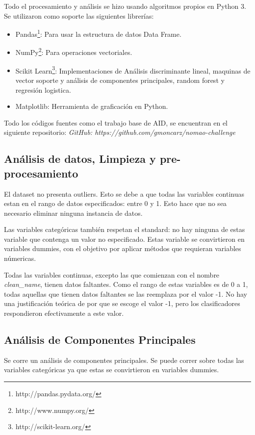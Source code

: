 \documentclass[journal]{IEEEtran}
\begin{document}
Todo el procesamiento y análisis se hizo usando algoritmos propios en Python 3. Se
utilizaron como soporte las siguientes librerías:
\begin{itemize}
\item Pandas\footnote{http://pandas.pydata.org/}: Para usar la estructura de datos Data Frame.
\item NumPy\footnote{http://www.numpy.org/}: Para operaciones vectoriales.
\item Scikit Learn\footnote{http://scikit-learn.org/}: Implementaciones de Análisis 
	discriminante lineal, maquinas de vector soporte y análisis
	de componentes principales, random forest y regresión logistica.
\item Matplotlib: Herramienta de graficación en Python.
\end{itemize}

Todo los códigos fuentes como el trabajo base de AID,
se encuentran en el siguiente repositorio: 
\textit{GitHub: https://github.com/gmoncarz/nomao-challenge}

\subsection{Análisis de datos, Limpieza y pre-procesamiento}
El dataset no presenta outliers. Esto se debe a que todas las variables continuas estan
en el rango de datos especificados: entre 0 y 1. 
Esto hace que no sea necesario eliminar ninguna
instancia de datos.

Las variables categóricas también respetan el standard: no hay ninguna
de estas variable que contenga un valor no especificado. Estas 
variable se convirtieron en variables dummies, con el objetivo 
por aplicar métodos que requieran variables númericas.

Todas las variables continuas, excepto las que comienzan con el
nombre \textit{clean\_name}, tienen datos faltantes. Como el rango
de estas variables es de 0 a 1, todas aquellas que tienen datos
faltantes se las reemplaza por el valor -1. No hay una justificación
teórica de por que se escoge el valor -1, pero los clasificadores
respondieron efectivamente a este valor.

\subsection{Análisis de Componentes Principales}
Se corre un análisis de componentes principales. Se puede correr sobre
todas las variables categóricas ya que estas se convirtieron en 
variables dummies.
\end{document}
